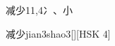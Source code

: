 \begin{entry}{减少}{11,4}{⼎、⼩}
  \begin{phonetics}{减少}{jian3shao3}[][HSK 4]
  \end{phonetics}
\end{entry}
